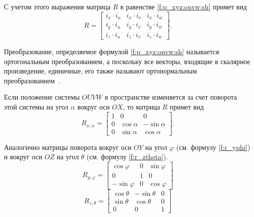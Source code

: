 \documentclass[oneside, final, 14pt]{extarticle}
\begin{document}
\par
С учетом этого выражения матрица \(R\) в равенстве \ref{f:p_xyz:ouvw:sh} примет вид
\begin{equation}\label{f:r}
  R = 
  \begin{bmatrix}
  i_x \cdot i_u & i_x \cdot i_v & i_x \cdot i_w\\
  i_y \cdot i_u & i_y \cdot i_v & i_y \cdot i_w\\
  i_z \cdot i_u & i_z \cdot i_v & i_z \cdot i_w
  \end{bmatrix}
  .
\end{equation}
\par
Преобразование, определяемое формулой \ref{f:p_xyz:ouvw:sh} называется ортогональным преобразованием, а поскольку все векторы, входящие в скалярное произведение, единичные, его также называют ортонормальным преобразованием~\cite{fu:rob_tech}.
\par
Если положение системы \(OUVW\) в пространстве изменяется за счет поворота этой системы на угол \(\alpha\) вокруг оси \(OX\), то матрица \(R\) примет вид
\begin{equation}\label{f:r_xalpha}
  R_{x,\alpha} = 
  \begin{bmatrix}
  1 & 0 & 0\\
  0 & \cos{\alpha} & -\sin{\alpha}\\
  0 & \sin{\alpha} & \cos{\alpha}
  \end{bmatrix}
  .
\end{equation}
\par
Аналогично матрицы поворота вокруг оси \(OY\) на угол \(\varphi\) (см. формулу \ref{f:r_yphi}) и вокруг оси \(OZ\) на угол \(\theta\) (см. формулу \ref{f:r_ztheta}).
\begin{equation}\label{f:r_yphi}
  R_{y,\varphi} =
  \begin{bmatrix}
  \cos{\varphi} & 0 & \sin{\varphi}\\
  0 & 1 & 0\\
  -\sin{\varphi} & 0 & \cos{\varphi}
  \end{bmatrix}
\end{equation}
\begin{equation}\label{f:r_ztheta}
  R_{z,\theta} =
  \begin{bmatrix}
  \cos{\theta} & -\sin{\theta} & 0\\
  \sin{\theta} & \cos{\theta} & 0\\
  0 & 0 & 1
  \end{bmatrix}
\end{equation}
\par
\end{document}
